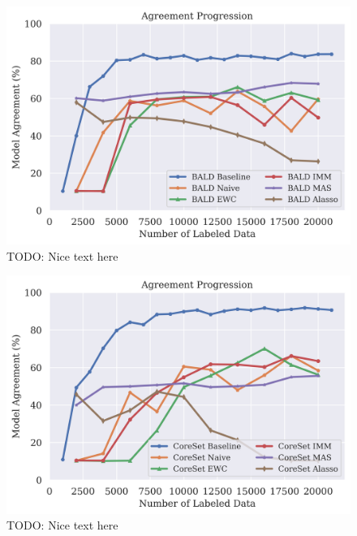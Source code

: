 \begin{figure}[h]
    \centering
    \includegraphics[width=0.8\linewidth]{images/results_CALMS/mnist_softmax_bald.png}
    \caption[Agreement Comparison for Model Stealing on MNIST using the softmax output and the Active Learning strategy BALD]{TODO: Nice text here}
    \label{fig:CALMSMNISTSoftmaxBALD}
\end{figure}

\begin{figure}[h]
    \centering
    \includegraphics[width=0.8\linewidth]{images/results_CALMS/mnist_softmax_coreset.png}
    \caption[Agreement Comparison for Model Stealing on MNIST using the softmax output and the Active Learning strategy CoreSet]{TODO: Nice text here}
    \label{fig:CALMSMNISTSoftmaxCoreSet}
\end{figure}


